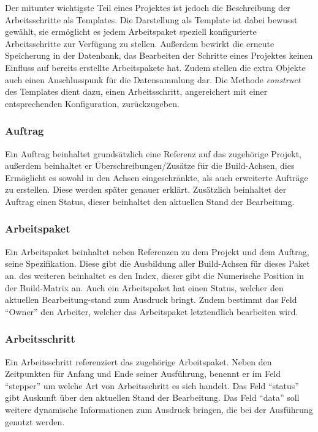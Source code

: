 Der mitunter wichtigste Teil eines Projektes ist jedoch die Beschreibung der Arbeitsschritte als Templates.
Die Darstellung als Template ist dabei bewusst gewählt,
sie ermöglicht es jedem Arbeitspaket speziell konfigurierte Arbeitsschritte zur Verfügung zu stellen.
Außerdem bewirkt die erneute Speicherung in der Datenbank,
das Bearbeiten der Schritte eines Projektes keinen Einfluss auf bereits erstellte Arbeitspakete hat.
Zudem stellen die extra Objekte auch einen Anschlusspunk für die Datensammlung dar.
Die Methode \textit{construct} des Templates dient dazu,
einen Arbeitsschritt, angereichert mit einer entsprechenden Konfiguration, zurückzugeben.

\subsubsection{Auftrag}

Ein Auftrag beinhaltet grundsätzlich eine Referenz auf das zugehörige Projekt,
außerdem beinhaltet er Überschreibungen/Zusätze für die Build-Achsen,
dies Ermöglicht es sowohl in den Achsen eingeschränkte,
als auch erweiterte Aufträge zu erstellen.
Diese werden später genauer erklärt.
Zusätzlich beinhaltet der Auftrag einen Status, dieser beinhaltet den aktuellen Stand der Bearbeitung.

\subsubsection{Arbeitspaket}
Ein Arbeitspaket beinhaltet neben Referenzen zu dem Projekt und dem Auftrag,
seine Spezifikation. Diese gibt die Ausbildung aller Build-Achsen für dieses Paket an.
des weiteren beinhaltet es den Index, dieser gibt die Numerische Position in der Build-Matrix an.
Auch ein Arbeitspaket hat einen Status, welcher den aktuellen Bearbeitung-stand zum Ausdruck bringt.
Zudem bestimmt das Feld ``Owner'' den Arbeiter, welcher das Arbeitspaket letztendlich bearbeiten wird.

\subsubsection{Arbeitsschritt}

Ein Arbeitsschritt referenziert das zugehörige Arbeitspaket.
Neben den Zeitpunkten für Anfang und Ende seiner Ausführung,
benennt er im Feld ``stepper'' um welche Art von Arbeitsschritt es sich handelt.
Das Feld ``status'' gibt Auskunft über den aktuellen Stand der Bearbeitung.
Das Feld ``data'' soll weitere dynamische Informationen zum Ausdruck bringen,
die bei der Ausführung genutzt werden.

